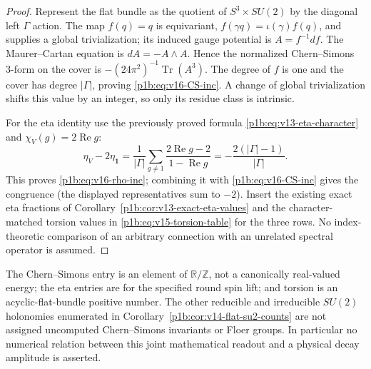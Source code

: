 \documentclass[11pt]{article}
\begin{document}
\begin{proof}
Represent the flat bundle as the quotient of
$S^3\times SU(2)$ by the diagonal left $\Gamma$ action.
The map $f(q)=q$ is equivariant,
$f(\gamma q)=\iota(\gamma)f(q)$, and supplies a global
trivialization; its induced gauge potential is
$A=f^{-1}df$.  The Maurer--Cartan equation is $dA=-A\wedge A$.
Hence the normalized Chern--Simons 3-form on the cover is
$-(24\pi^2)^{-1}\operatorname{Tr}(A^3)$.
The degree of $f$ is one and the cover has degree $|\Gamma|$,
proving \eqref{p1b:eq:v16-CS-inc}.
A change of global trivialization shifts this value by an integer,
so only its residue class is intrinsic.

For the eta identity use the previously proved formula
\eqref{p1b:eq:v13-eta-character} and
$\chi_V(g)=2\operatorname{Re}g$:
\[
\eta_V-2\eta_{\mathbf1}
 =\frac1{|\Gamma|}\sum_{g\ne1}
   \frac{2\operatorname{Re}g-2}{1-\operatorname{Re}g}
 =-\frac{2(|\Gamma|-1)}{|\Gamma|}.
\]
This proves \eqref{p1b:eq:v16-rho-inc}; combining it with
\eqref{p1b:eq:v16-CS-inc} gives the congruence (the displayed
representatives sum to $-2$).
Insert the existing exact eta fractions of
Corollary~\ref{p1b:cor:v13-exact-eta-values} and the
character-matched torsion values in \eqref{p1b:eq:v15-torsion-table}
for the three rows.  No index-theoretic comparison of an arbitrary
connection with an unrelated spectral operator is assumed.
\end{proof}
\begin{remark}
\label{p1b:rem:v16-joint-owner-boundary}
The Chern--Simons entry is an element of $\mathbb R/\mathbb Z$,
not a canonically real-valued energy; the eta entries are for the
specified round spin lift; and torsion is an acyclic-flat-bundle
positive number.  The other reducible and irreducible $SU(2)$
holonomies enumerated in Corollary~\ref{p1b:cor:v14-flat-su2-counts}
are not assigned uncomputed Chern--Simons invariants or Floer groups.
In particular no numerical relation between this joint mathematical
readout and a physical decay amplitude is asserted.
\end{remark}
\end{document}
